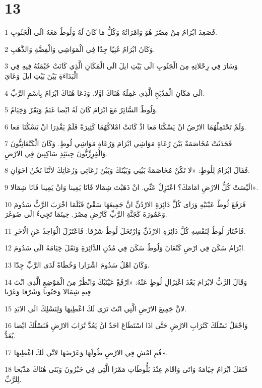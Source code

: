 \chapter{13}

\par 1 فَصَعِدَ ابْرَامُ مِنْ مِصْرَ هُوَ وَامْرَاتُهُ وَكُلُّ مَا كَانَ لَهُ وَلُوطٌ مَعَهُ الَى الْجَنُوبِ.
\par 2 وَكَانَ ابْرَامُ غَنِيّا جِدّا فِي الْمَوَاشِي وَالْفِضَّةِ وَالذَّهَبِ.
\par 3 وَسَارَ فِي رِحْلاتِهِ مِنَ الْجَنُوبِ الَى بَيْتِ ايلَ الَى الْمَكَانِ الَّذِي كَانَتْ خَيْمَتُهُ فِيهِ فِي الْبَدَاءَةِ بَيْنَ بَيْتِ ايلَ وَعَايَ
\par 4 الَى مَكَانِ الْمَذْبَحِ الَّذِي عَمِلَهُ هُنَاكَ اوَّلا. وَدَعَا هُنَاكَ ابْرَامُ بِاسْمِ الرَّبِّ.
\par 5 وَلُوطٌ السَّائِرُ مَعَ ابْرَامَ كَانَ لَهُ ايْضا غَنَمٌ وَبَقَرٌ وَخِيَامٌ.
\par 6 وَلَمْ تَحْتَمِلْهُمَا الارْضُ انْ يَسْكُنَا مَعا اذْ كَانَتْ امْلاكُهُمَا كَثِيرَةً فَلَمْ يَقْدِرَا انْ يَسْكُنَا مَعا.
\par 7 فَحَدَثَتْ مُخَاصَمَةٌ بَيْنَ رُعَاةِ مَوَاشِي ابْرَامَ وَرُعَاةِ مَوَاشِي لُوطٍ. وَكَانَ الْكَنْعَانِيُّونَ وَالْفِرِزِّيُّونَ حِينَئِذٍ سَاكِنِينَ فِي الارْضِ.
\par 8 فَقَالَ ابْرَامُ لِلُوطٍ: «لا تَكُنْ مُخَاصَمَةٌ بَيْنِي وَبَيْنَكَ وَبَيْنَ رُعَاتِي وَرُعَاتِكَ لانَّنَا نَحْنُ اخَوَانِ.
\par 9 الَيْسَتْ كُلُّ الارْضِ امَامَكَ؟ اعْتَزِلْ عَنِّي. انْ ذَهَبْتَ شِمَالا فَانَا يَمِينا وَانْ يَمِينا فَانَا شِمَالا».
\par 10 فَرَفَعَ لُوطٌ عَيْنَيْهِ وَرَاى كُلَّ دَائِرَةِ الارْدُنِّ انَّ جَمِيعَهَا سَقْيٌ قَبْلَمَا اخْرَبَ الرَّبُّ سَدُومَ وَعَمُورَةَ كَجَنَّةِ الرَّبِّ كَارْضِ مِصْرَ. حِينَمَا تَجِيءُ الَى صُوغَرَ.
\par 11 فَاخْتَارَ لُوطٌ لِنَفْسِهِ كُلَّ دَائِرَةِ الارْدُنِّ وَارْتَحَلَ لُوطٌ شَرْقا. فَاعْتَزَلَ الْوَاحِدُ عَنِ الْاخَرِ.
\par 12 ابْرَامُ سَكَنَ فِي ارْضِ كَنْعَانَ وَلُوطٌ سَكَنَ فِي مُدُنِ الدَّائِرَةِ وَنَقَلَ خِيَامَهُ الَى سَدُومَ.
\par 13 وَكَانَ اهْلُ سَدُومَ اشْرَارا وَخُطَاةً لَدَى الرَّبِّ جِدّا.
\par 14 وَقَالَ الرَّبُّ لابْرَامَ بَعْدَ اعْتِزَالِ لُوطٍ عَنْهُ: «ارْفَعْ عَيْنَيْكَ وَانْظُرْ مِنَ الْمَوْضِعِ الَّذِي انْتَ فِيهِ شِمَالا وَجَنُوبا وَشَرْقا وَغَرْبا
\par 15 لانَّ جَمِيعَ الارْضِ الَّتِي انْتَ تَرَى لَكَ اعْطِيهَا وَلِنَسْلِكَ الَى الابَدِ.
\par 16 وَاجْعَلُ نَسْلَكَ كَتُرَابِ الارْضِ حَتَّى اذَا اسْتَطَاعَ احَدٌ انْ يَعُدَّ تُرَابَ الارْضِ فَنَسْلُكَ ايْضا يُعَدُّ.
\par 17 قُمِ امْشِ فِي الارْضِ طُولَهَا وَعَرْضَهَا لانِّي لَكَ اعْطِيهَا».
\par 18 فَنَقَلَ ابْرَامُ خِيَامَهُ وَاتَى وَاقَامَ عِنْدَ بَلُّوطَاتِ مَمْرَا الَّتِي فِي حَبْرُونَ وَبَنَى هُنَاكَ مَذْبَحا لِلرَّبِّ.

